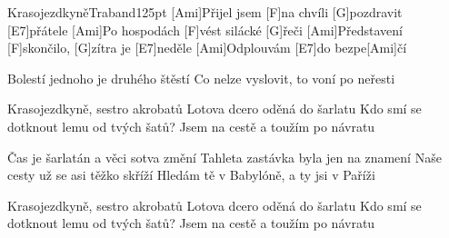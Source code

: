 \begin{song}{Krasojezdkyně}{Traband}{125pt}
%
[Ami]Přijel jsem [F]na chvíli [G]pozdravit [E7]přátele
[Ami]Po hospodách [F]vést silácké [G]{}řeči
[Ami]Představení [F]skončilo, [G]zítra je [E7]neděle
[Ami]Odplouvám [E7]do bezpe[Ami]{}čí

Bolestí jednoho je druhého štěstí
Co nelze vyslovit, to voní po neřesti

\chorus%
Krasojezdkyně, sestro akrobatů
Lotova dcero oděná do šarlatu
Kdo smí se dotknout lemu od tvých šatů?
Jsem na cestě a toužím po návratu

%
Čas je šarlatán a věci sotva změní
Tahleta zastávka byla jen na znamení
Naše cesty už se asi těžko skříží
Hledám tě v Babylóně, a ty jsi v Paříži

\chorus%
Krasojezdkyně, sestro akrobatů
Lotova dcero oděná do šarlatu
Kdo smí se dotknout lemu od tvých šatů?
Jsem na cestě a toužím po návratu
\end{song}
